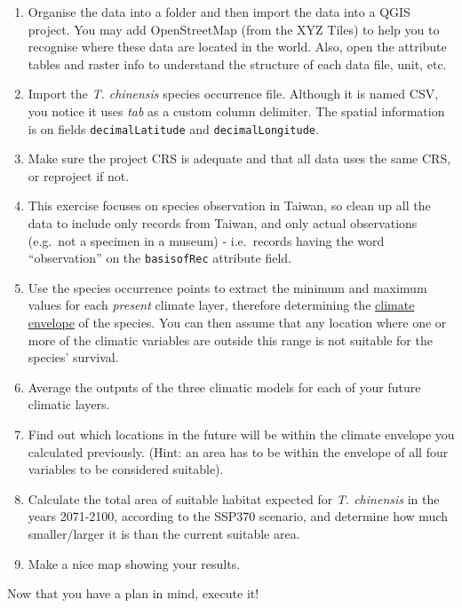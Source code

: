 \documentclass[
  letterpaper,
  DIV=11,
  numbers=noendperiod]{scrreprt}
\begin{document}
\begin{enumerate}
\def\labelenumi{\arabic{enumi})}
\item
  Organise the data into a folder and then import the data into a QGIS
  project. You may add OpenStreetMap (from the XYZ Tiles) to help you to
  recognise where these data are located in the world. Also, open the
  attribute tables and raster info to understand the structure of each
  data file, unit, etc.
\item
  Import the \emph{T. chinensis} species occurrence file. Although it is
  named CSV, you notice it uses \emph{tab} as a custom column delimiter.
  The spatial information is on fields \texttt{decimalLatitude} and
  \texttt{decimalLongitude}.
\item
  Make sure the project CRS is adequate and that all data uses the same
  CRS, or reproject if not.
\item
  This exercise focuses on species observation in Taiwan, so clean up
  all the data to include only records from Taiwan, and only actual
  observations (e.g.~not a specimen in a museum) - i.e.~records having
  the word ``observation'' on the \texttt{basisofRec} attribute field.
\item
  Use the species occurrence points to extract the minimum and maximum
  values for each \emph{present} climate layer, therefore determining
  the
  \href{https://www.usgs.gov/centers/wetland-and-aquatic-research-center/science/climate-envelope-modeling-evaluating}{climate
  envelope} of the species. You can then assume that any location where
  one or more of the climatic variables are outside this range is not
  suitable for the species' survival.
\item
  Average the outputs of the three climatic models for each of your
  future climatic layers.
\item
  Find out which locations in the future will be within the climate
  envelope you calculated previously. (Hint: an area has to be within
  the envelope of all four variables to be considered suitable).
\item
  Calculate the total area of suitable habitat expected for \emph{T.
  chinensis} in the years 2071-2100, according to the SSP370 scenario,
  and determine how much smaller/larger it is than the current suitable
  area.
\item
  Make a nice map showing your results.
\end{enumerate}

Now that you have a plan in mind, execute it!
\end{document}
